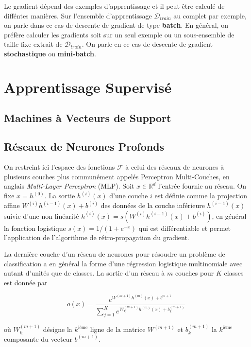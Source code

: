 Le gradient dépend des exemples d'apprentissage et il peut être calculé de
difféntes manières. Sur l'ensemble d'apprentissage $\mathcal{D}_{train}$ au
complet par exemple, on parle dans ce cas de descente de gradient de type
{\bf batch}. En général, on préfère calculer les gradients soit sur un seul exemple
ou un sous-ensemble de taille fixe extrait de $\mathcal{D}_{train}$. On parle
en ce cas de descente de gradient {\bf stochastique} ou {\bf mini-batch}.

\section{Apprentissage Supervisé}

\subsection{Machines à Vecteurs de Support}


\subsection{Réseaux de Neurones Profonds}

On restreint ici l'espace des fonctions $\mathcal{F}$ à celui des réseaux de
neurones à plusieurs couches plus communément appelés Perceptron Multi-Couches,
en anglais \textit{Multi-Layer Perceptron} (MLP)\citep{Rosenblatt-1958}. Soit
$x\in\mathbb{R}^d$ l'entrée fournie au réseau. On fixe $x=h^{(0)}$. La sortie
$h^{(i)}(x)$ d'une couche $i$ est définie comme la projection affine
$W^{(i)}h^{(i-1)}(x) + b^{(i)}$ des données de la couche inférieure $h^{(i-1)}(x)$
suivie d'une non-linéarité $h^{(i)}(x)= s(W^{(i)}h^{(i-1)}(x) + b^{(i)})$, en
général la fonction logistique $s(x)=1/(1+e^{-x})$ qui est différentiable et
permet l'application de l'algorithme de rétro-propagation du gradient. 

La dernière couche d'un réseau de neurones pour résoudre un problème de
classification a en général la forme d'une régression logistique multinomiale
avec autant d'unités que de classes. La sortie d'un réseau à $m$ couches pour
$K$ classes est donnée par

\begin{equation}
o(x) = \frac{e^{W^{(m+1)} h^{(m)}(x) + b^{m+1}}}{\sum_{j=1}^K e^{W^{(m+1)}_{k.} h^{(m)}(x) + b^{(m+1)}_k }}
\end{equation}

où $W_{k.}^{(m+1)}$ désigne la $k^\textrm{ième}$ ligne de la matrice $W^{(m+1)}$
et $b_k^{(m+1)}$ la $k^\textrm{ième}$ composante du vecteur $b^{(m+1)}$.
\\

